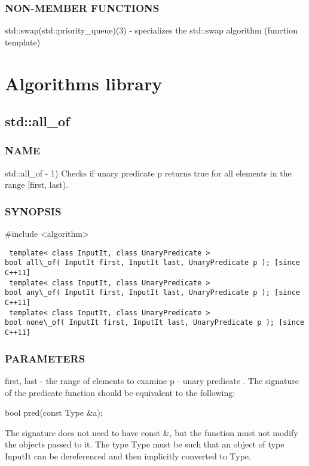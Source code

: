 \subsubsection{NON-MEMBER FUNCTIONS}
std::swap(std::priority\_queue)(3) - specializes the std::swap algorithm   (function template)


\section{Algorithms library}

\subsection{std::all\_of}

\subsubsection{NAME}
std::all\_of - 1) Checks if unary predicate p returns true for all elements in the range [first, last).

\subsubsection{SYNOPSIS}
\#include <algorithm>

\begin{lstlisting}
 template< class InputIt, class UnaryPredicate >
bool all\_of( InputIt first, InputIt last, UnaryPredicate p ); [since C++11]
 template< class InputIt, class UnaryPredicate >
bool any\_of( InputIt first, InputIt last, UnaryPredicate p ); [since C++11]
 template< class InputIt, class UnaryPredicate >
bool none\_of( InputIt first, InputIt last, UnaryPredicate p ); [since C++11]
\end{lstlisting}

\subsubsection{PARAMETERS}
first, last - the range of elements to examine
p - unary predicate .
The signature of the predicate function should be equivalent to the following:

 bool pred(const Type \&a);

The signature does not need to have const \&, but the function must not modify the objects passed to it.
The type Type must be such that an object of type InputIt can be dereferenced and then implicitly converted to Type.

